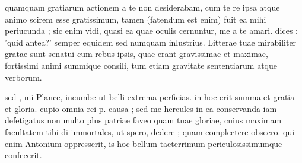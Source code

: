 


 quamquam gratiarum actionem a te non desiderabam, cum te re ipsa atque animo scirem esse gratissimum, tamen (fatendum est enim) fuit ea mihi periucunda ; sic enim vidi, quasi ea quae oculis cernuntur, me a te amari. dices : 'quid antea?' semper equidem sed numquam inlustrius. Litterae tuae mirabiliter gratae sunt senatui cum rebus ipsis, quae erant gravissimae et maximae, fortissimi animi summique consili, tum etiam gravitate sententiarum atque verborum.

 sed , mi Plance, incumbe ut belli extrema perficias. in hoc erit summa et gratia et gloria. cupio omnia rei p. causa ; sed me hercules in ea conservanda iam defetigatus non multo plus patriae faveo quam tuae gloriae, cuius maximam facultatem tibi di immortales, ut spero, dedere ; quam complectere obsecro. qui enim Antonium oppresserit, is hoc bellum taeterrimum periculosissimumque confecerit.
